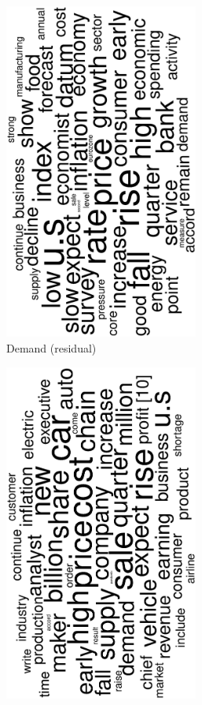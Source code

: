 \begin{figure}
\begin{subfigure}{0.32\textwidth}
		\includegraphics[width=0.7\textwidth,angle=270]{figures/wordcloud8.eps}
		\caption{Demand (residual)}
	\end{subfigure}
	\begin{subfigure}{0.32\textwidth}
		\includegraphics[width=0.7\textwidth,angle=270]{figures/wordcloud5.eps}

\end{subfigure}
\end{figure}
